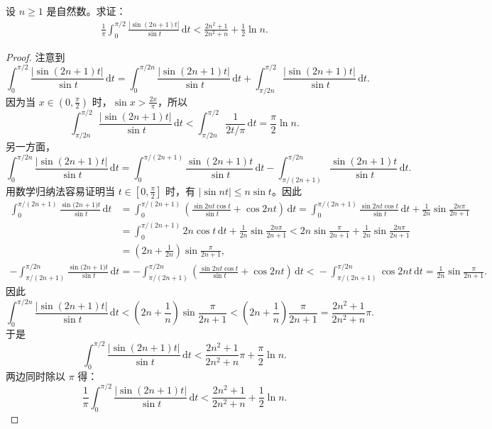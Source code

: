 \documentclass[../../main.tex]{subfiles}
\begin{document}
\begin{example}
设 \( n \geqslant 1 \) 是自然数。求证：
\begin{align*}
\frac{1}{\pi} \int_{0}^{\pi/2} \frac{|\sin(2n + 1)t|}{\sin t} \, \mathrm{d}t < \frac{2n^2 + 1}{2n^2 + n} + \frac{1}{2} \ln n.
\end{align*}
\end{example}
\begin{proof}
注意到
\[
\int_{0}^{\pi/2} \frac{|\sin(2n + 1)t|}{\sin t} \, \mathrm{d}t = \int_{0}^{\pi/2n} \frac{|\sin(2n + 1)t|}{\sin t} \, \mathrm{d}t + \int_{\pi/2n}^{\pi/2} \frac{|\sin(2n + 1)t|}{\sin t} \, \mathrm{d}t.
\]
因为当 \( x \in \left( 0, \frac{\pi}{2} \right) \) 时，\( \sin x > \frac{2x}{\pi} \)，所以
\[
\int_{\pi/2n}^{\pi/2} \frac{|\sin(2n + 1)t|}{\sin t} \, \mathrm{d}t < \int_{\pi/2n}^{\pi/2} \frac{1}{2t/\pi} \, \mathrm{d}t = \frac{\pi}{2} \ln n.
\]
另一方面，
\[
\int_{0}^{\pi/2n} \frac{|\sin(2n + 1)t|}{\sin t} \, \mathrm{d}t = \int_{0}^{\pi/(2n + 1)} \frac{\sin(2n + 1)t}{\sin t} \, \mathrm{d}t - \int_{\pi/(2n + 1)}^{\pi/2n} \frac{\sin(2n + 1)t}{\sin t} \, \mathrm{d}t.
\]
用数学归纳法容易证明当 \( t \in \left[ 0, \frac{\pi}{2} \right] \) 时，有 \( |\sin nt| \leqslant n \sin t \)。因此
\begin{align*}
\int_0^{\pi/(2n+1)}{\frac{\sin\mathrm{(}2n+1)t}{\sin t}\,\mathrm{d}t}&=\int_0^{\pi/(2n+1)}{\left( \frac{\sin 2nt\cos t}{\sin t}+\cos 2nt \right) \,\mathrm{d}t=\int_0^{\pi/(2n+1)}{\frac{\sin 2nt\cos t}{\sin t}\,\mathrm{d}t}}+\frac{1}{2n}\sin \frac{2n\pi}{2n+1}
\\
&=\int_0^{\pi/(2n+1)}{2n\cos t\,\mathrm{d}t}+\frac{1}{2n}\sin \frac{2n\pi}{2n+1}<2n\sin \frac{\pi}{2n+1}+\frac{1}{2n}\sin \frac{2n\pi}{2n+1}
\\
&=\left( 2n+\frac{1}{2n} \right) \sin \frac{\pi}{2n+1},
\end{align*}
\begin{align*}
-\int_{\pi/(2n+1)}^{\pi/2n}{\frac{\sin\mathrm{(}2n+1)t}{\sin t}\,\mathrm{d}t}=-\int_{\pi/(2n+1)}^{\pi/2n}{\left( \frac{\sin 2nt\cos t}{\sin t}+\cos 2nt \right) \,\mathrm{d}t<}-\int_{\pi/(2n+1)}^{\pi/2n}{\cos 2nt\,\mathrm{d}t=\frac{1}{2n}\sin \frac{\pi}{2n+1}.}
\end{align*}
因此
\[
\int_{0}^{\pi/2n} \frac{|\sin(2n + 1)t|}{\sin t} \, \mathrm{d}t < \left( 2n + \frac{1}{n} \right) \sin \frac{\pi}{2n + 1} < \left( 2n + \frac{1}{n} \right) \frac{\pi}{2n + 1} = \frac{2n^2 + 1}{2n^2 + n} \pi.
\]
于是
\[
\int_{0}^{\pi/2} \frac{|\sin(2n + 1)t|}{\sin t} \, \mathrm{d}t < \frac{2n^2 + 1}{2n^2 + n} \pi + \frac{\pi}{2} \ln n.
\]
两边同时除以 \( \pi \) 得：
\[
\frac{1}{\pi} \int_{0}^{\pi/2} \frac{|\sin(2n + 1)t|}{\sin t} \, \mathrm{d}t < \frac{2n^2 + 1}{2n^2 + n} + \frac{1}{2} \ln n.
\]
\end{proof}
\end{document}
